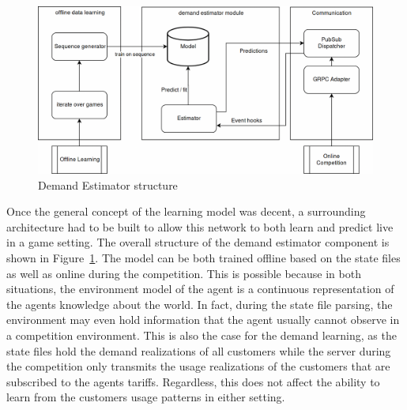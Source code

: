 
\begin{figure}[h]
    \centering
    \includegraphics[width=1.0\linewidth]{img/UsageEstimator.png}
    \caption{Demand Estimator structure}
    \label{fig:DemandEstimator}
\end{figure}

Once the general concept of the learning model was decent, a surrounding architecture had to be built to allow this
network to both learn and predict live in a game setting.
The overall structure of the demand estimator component is shown in Figure~\ref{fig:DemandEstimator}. The model can be
both trained offline based on the state files as well as online during the competition. This is possible because in both
situations, the environment model of the agent is a continuous representation of the agents knowledge about the world.
In fact, during the state file parsing, the environment may even hold information that the agent usually cannot observe
in a competition environment. This is also the case for the demand learning, as the state files hold the demand
realizations of all customers while the server during the competition only transmits the usage realizations of the
customers that are subscribed to the agents tariffs. Regardless, this does not affect the ability to learn from the
customers usage patterns in either setting. 

